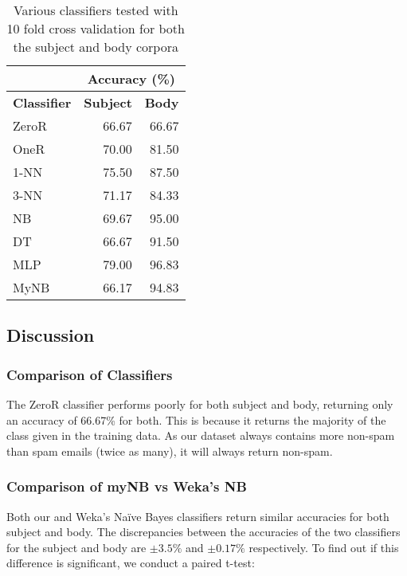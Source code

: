 \documentclass[10pt, a4paper]{article}
\begin{document}
\begin{table}[H]
\centering
\caption{Various classifiers tested with 10 fold cross validation for both the subject and body corpora}
\begin{tabular}{@{}lrr@{}}
\toprule
& \multicolumn{2}{c}{\textbf{Accuracy (\%)}} \\
\midrule
\textbf{Classifier} & \textbf{Subject} & \textbf{Body} \\
\midrule
ZeroR & 66.67 & 66.67 \\
OneR & 70.00 & 81.50 \\
1-NN & 75.50 & 87.50 \\
3-NN & 71.17 & 84.33 \\
NB & 69.67 & 95.00 \\
DT & 66.67 & 91.50 \\
MLP & 79.00 & 96.83 \\
MyNB & 66.17 & 94.83 \\
\bottomrule
\end{tabular}
\label{table:results}
\end{table}

\subsection{Discussion}

%

\subsubsection{Comparison of Classifiers}

The ZeroR classifier performs poorly for both subject and body, returning only an accuracy of 66.67\% for both. This is because it returns the majority of the class given in the training data. As our dataset always contains more non-spam than spam emails (twice as many), it will always return non-spam.

\subsubsection{Comparison of myNB vs Weka's NB}

Both our and Weka's Na\"ive Bayes classifiers return similar accuracies for both subject and body. The discrepancies between the accuracies of the two classifiers for the subject and body are $\pm 3.5\%$ and $\pm 0.17\%$ respectively. To find out if this difference is significant, we conduct a paired t-test:
\end{document}
